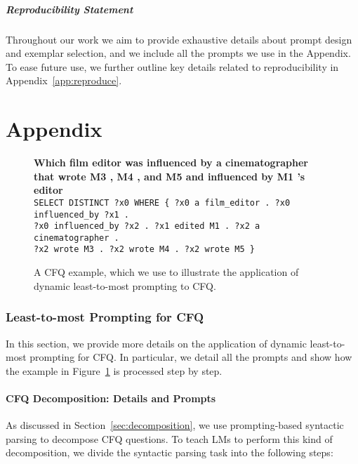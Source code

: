 \documentclass{article} \usepackage{iclr2022_conference,times}
\begin{document}
\subsubsection*{Reproducibility Statement}

Throughout our work we aim to provide exhaustive details about prompt design and exemplar selection, and we include all the prompts we use in the Appendix. To ease future use, we further outline key details related to reproducibility in Appendix~\ref{app:reproduce}.





\clearpage
\appendix


 \part{Appendix} \parttoc 

\clearpage

\begin{figure}[h!]
\begin{flushleft}
\small{
    \textbf{Which film editor was influenced by a cinematographer that wrote M3 , M4 , and M5 and influenced by M1 's editor} \\
    \texttt{SELECT DISTINCT ?x0 WHERE \{ ?x0 a film\_editor . ?x0 influenced\_by ?x1 .\\
    \phantom{0000}?x0 influenced\_by ?x2 . ?x1 edited M1 . ?x2 a cinematographer .\\
    \phantom{0000}?x2 wrote M3 . ?x2 wrote M4 . ?x2 wrote M5 \}}
}
\end{flushleft}
    \caption{A CFQ example, which we use to illustrate the application of dynamic least-to-most prompting to CFQ.}
    \label{fig:cfq_example_e2e}
\end{figure}

\section{Least-to-most Prompting for CFQ}
\label{app:l2m_cfq}

In this section, we provide more details on the application of dynamic least-to-most prompting for CFQ. In particular, we detail all the prompts and show how the example in Figure~\ref{fig:cfq_example_e2e} is processed step by step.

\subsection{CFQ Decomposition: Details and Prompts}
\label{app:cfq_decomposition}
As discussed in Section~\ref{sec:decomposition}, we use prompting-based syntactic parsing to decompose CFQ questions. To teach LMs to perform this kind of decomposition, we divide the syntactic parsing task into the following steps:
\end{document}

